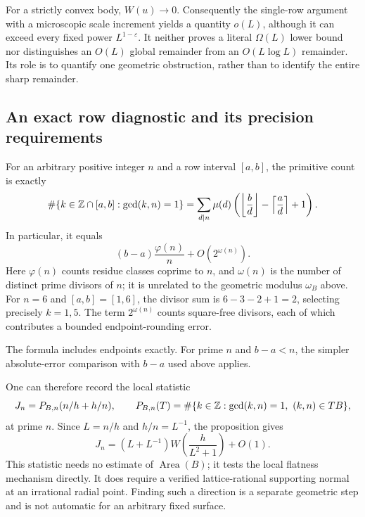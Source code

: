 For a strictly convex body, $W(u)\to0$. Consequently the single-row
argument with a microscopic scale increment yields a quantity $o(L)$,
although it can exceed every fixed power $L^{1-\varepsilon}$.
It neither proves a literal $\Omega(L)$ lower bound nor distinguishes
an $O(L)$ global remainder from an $O(L\log L)$ remainder. Its role is
to quantify one geometric obstruction, rather than to identify the
entire sharp remainder.

\subsection{An exact row diagnostic and its precision requirements}
\label{subsec:rowdiagnostic}

For an arbitrary positive integer $n$ and a row interval $[a,b]$, the
primitive count is exactly
\begin{equation}
 \#\{k\in\mathbb Z\cap[a,b]:\gcd(k,n)=1\}
 =\sum_{d\mid n}\mu(d)
 \left(\left\lfloor\frac bd\right\rfloor
       -\left\lceil\frac ad\right\rceil+1\right).
 \label{eq:primitiveintervalexact}
\end{equation}
In particular, it equals
\[
 (b-a)\frac{\varphi(n)}n+O(2^{\omega(n)}).
\]
Here $\varphi(n)$ counts residue classes coprime to $n$, and
$\omega(n)$ is the number of distinct prime divisors of $n$;
it is unrelated to the geometric modulus $\omega_B$ above.
For $n=6$ and $[a,b]=[1,6]$, the divisor sum is
$6-3-2+1=2$, selecting precisely $k=1,5$.
The term $2^{\omega(n)}$ counts square-free divisors, each of
which contributes a bounded endpoint-rounding error.

The formula includes endpoints exactly. For prime $n$ and $b-a<n$,
the simpler absolute-error comparison with $b-a$ used above applies.

One can therefore record the local statistic
\[
 J_n=P_{B,n}(n/h+h/n),\qquad
 P_{B,n}(T)=\#\{k\in\mathbb Z:\gcd(k,n)=1,\ (k,n)\in TB\},
\]
at prime $n$. Since $L=n/h$ and $h/n=L^{-1}$, the proposition gives
\[
 J_n=(L+L^{-1})W\!\left(\frac h{L^2+1}\right)+O(1).
\]
This statistic needs no estimate of $\operatorname{Area}(B)$; it tests
the local flatness mechanism directly. It does require a verified
lattice-rational supporting normal at an irrational radial point.
Finding such a direction is a separate geometric step and is not
automatic for an arbitrary fixed surface.

